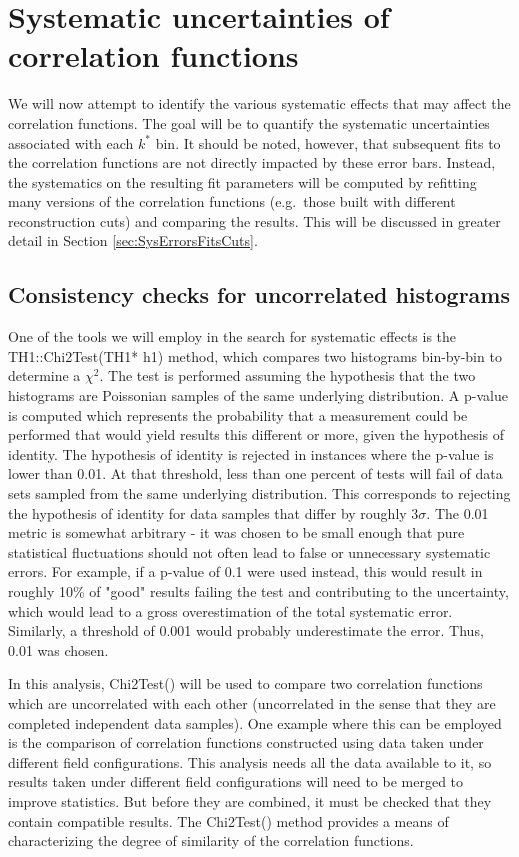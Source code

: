 \section{Systematic uncertainties of correlation functions}
\label{sec:SysUncertaintyCF}

We will now attempt to identify the various systematic effects that may affect the correlation functions.  
The goal will be to quantify the systematic uncertainties associated with each $k^*$ bin.  
It should be noted, however, that subsequent fits to the correlation functions are not directly impacted by these error bars.  
Instead, the systematics on the resulting fit parameters will be computed by refitting many versions of the correlation functions (e.g.\ those built with different reconstruction cuts) and comparing the results. 
This will be discussed in greater detail in Section \ref{sec:SysErrorsFitsCuts}.

\subsection{Consistency checks for uncorrelated histograms}
\label{sec:ConsistencyCheckUncorrelated}
One of the tools we will employ in the search for systematic effects is the TH1::Chi2Test(TH1* h1) method, which compares two histograms bin-by-bin to determine a $\chi^2$.  
The test is performed assuming the hypothesis that the two histograms are Poissonian samples of the same underlying distribution.  
A p-value is computed which represents the probability that a measurement could be performed that would yield results this different or more, given the hypothesis of identity.  
The hypothesis of identity is rejected in instances where the p-value is lower than 0.01. 
At that threshold, less than one percent of tests will fail of data sets sampled from the same underlying distribution.  
This corresponds to rejecting the hypothesis of identity for data samples that differ by roughly $3 \sigma$.  
The 0.01 metric is somewhat arbitrary - it was chosen to be small enough that pure statistical fluctuations should not often lead to false or unnecessary systematic errors.  
For example, if a p-value of 0.1 were used instead, this would result in roughly 10\% of "good" results failing the test and contributing to the uncertainty, which would lead to a gross overestimation of the total systematic error.  
Similarly, a threshold of 0.001 would probably underestimate the error.  
Thus, 0.01 was chosen.

In this analysis, Chi2Test() will be used to compare two correlation functions which are uncorrelated with each other (uncorrelated in the sense that they are completed independent data samples).  
One example where this can be employed is the comparison of correlation functions constructed using data taken under different field configurations.  
This analysis needs all the data available to it, so results taken under different field configurations will need to be merged to improve statistics.  
But before they are combined, it must be checked that they contain compatible results.  
The Chi2Test() method provides a means of characterizing the degree of similarity of the correlation functions.  

